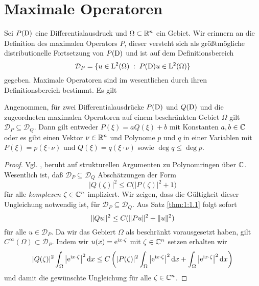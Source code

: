 \chapter{Maximale Operatoren}


Sei $P(\mathrm D)$ eine Differentialausdruck und $\Omega\subset\mathbb R^n$ ein Gebiet. Wir erinnern an die Definition des maximalen Operators $P$, dieser versteht sich als größtmögliche distributionelle Fortsetzung von $P(\mathrm D)$ und ist auf dem Definitionsbereich
\begin{equation}
   \mathcal D_P = \{ u\in\mathrm L^2(\Omega)\;:\; P(\mathrm D)u\in\mathrm L^2(\Omega) \}
\end{equation}
gegeben. Maximale Operatoren sind im wesentlichen durch ihren Definitionsbereich bestimmt. Es gilt
\begin{thm}
Angenommen, für zwei Differentialausdrücke $P(\mathrm D)$ und $Q(\mathrm D)$ und die zugeordneten maximalen Operatoren auf einem beschränkten Gebiet $\Omega$ gilt $\mathcal D_P\subseteq\mathcal D_Q$. Dann gilt
entweder $P(\xi)=a Q(\xi) + b$ mit Konstanten $a,b\in\mathbb C$ oder es gibt einen Vektor $\nu\in\mathbb R^n$ und Polynome $p$ und $q$ in einer Variablen mit
$P(\xi)=p(\xi\cdot\nu)$ und $Q(\xi)=q(\xi\cdot\nu)$ sowie $\deg q\le\deg p$.
\end{thm}
\begin{proof} Vgl. \cite{Hormander:1955}, beruht auf strukturellen Argumenten zu Polynomringen über $\mathbb C$. Wesentlich ist, daß $\mathcal D_P\subseteq \mathcal D_Q$ Abschätzungen der Form
\begin{equation}
   |Q(\zeta)|^2 \le C \big( |P(\zeta)|^2 + 1\big)%
\end{equation}
für alle {\em komplexen} $\zeta\in\mathbb C^n$ impliziert. Wir zeigen, dass die Gültigkeit dieser Ungleichung notwendig ist, für $\mathcal D_P\subseteq\mathcal D_Q$. Aus Satz \ref{thm:1:1.1} folgt sofort
\begin{equation}
\lVert Qu\rVert^2\leq C(\lVert Pu\rVert^2+\lVert u\rVert^2)
\end{equation}
für alle $u\in\mathcal{D}_P$. Da wir das Gebiert $\Omega$ als beschränkt vorausgesetzt haben, gilt $C^\infty(\Omega)\subset\mathcal{D}_P$. Indem wir $u(x)=\mathrm e^{\mathrm i x\cdot \zeta}$ mit $\zeta\in\mathbb C^n$ setzen erhalten wir
\begin{equation}
\lvert Q(\zeta)\rvert^2\int_\Omega \big|\mathrm e^{\mathrm i x\cdot \zeta}\big|^2\,\mathrm d x \leq C \left( \lvert P(\zeta)\rvert^2\int_\Omega \big|\mathrm e^{\mathrm i x\cdot \zeta}\big|^2\,\mathrm d x+\int_\Omega \big|\mathrm e^{\mathrm i x\cdot \zeta}\big|^2\,\mathrm d x  \right)
\end{equation}
und damit die gewünschte Ungleichung für alle $\zeta\in\mathbb C^n$.
\end{proof}




